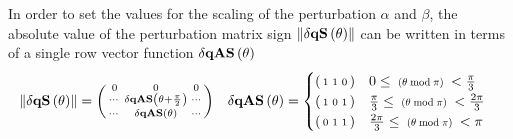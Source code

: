 In order to set the values for the scaling of the perturbation $\alpha$ and $\beta$, the absolute value of the perturbation matrix sign $\left\lVert \dqs[\theta] \right\rVert$ can be written in terms of a single row vector function $\dqas[\theta]$ 
\begin{align*}
\left\lVert \dqs[\theta] \right\rVert & = 
\left( \begin{smallmatrix}  0&0&0   \\   \cdots & \dqas[\theta + \frac{\pi}{2}] & \cdots   \\  \cdots & \dqas[\theta]   & \cdots  \\ \end{smallmatrix}  \right) 
&
\dqas[\theta] &=\begin{cases}
\left(\begin{smallmatrix} 1 & 1 & 0 \end{smallmatrix} \right)&  0                     \leq \scalebox{0.75}{ $(\theta \bmod \pi )$ }<\frac{   \pi }{3} \\
\left(\begin{smallmatrix} 1 & 0 & 1 \end{smallmatrix} \right)&  \frac{   \pi }{3}\leq \scalebox{0.75}{ $(\theta \bmod \pi )$ }<\frac{2 \pi }{3} \\
\left(\begin{smallmatrix} 0 & 1 & 1 \end{smallmatrix} \right) & \frac{2 \pi }{3}\leq \scalebox{0.75}{ $(\theta \bmod \pi )$ }<\pi  \\
\end{cases} 
\end{align*}
